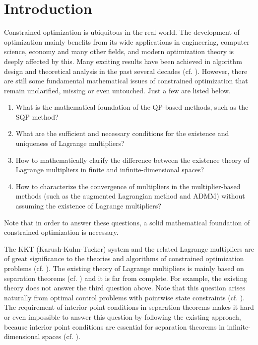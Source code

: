 \documentclass[leqno]{amsart}
\theoremstyle{definition}
\begin{document}
\section{Introduction}
Constrained optimization is ubiquitous in the real world. The development of optimization mainly benefits from its wide applications in engineering, computer science, economy and many other fields, and modern optimization theory is deeply affected by this. Many exciting results have been achieved in algorithm design and theoretical analysis in the past several decades (cf. \cite{bertsekas1996constrained, boyd2004convex, hinze2008optimization, ito2008lagrange, nocedal2006numerical}). However, there are still some fundamental mathematical issues of constrained optimization that remain unclarified, missing or even untouched. Just a few are listed below.
\begin{enumerate}[$\bullet$]
  \item What is the mathematical foundation of the QP-based methods, such as the SQP method?
  
  \item  What are the sufficient and necessary conditions for the existence and uniqueness of Lagrange multipliers? 
  
  \item  How to mathematically clarify the difference between the existence theory of Lagrange multipliers in finite and infinite-dimensional spaces?
  
  \item How to characterize the convergence of multipliers in the multiplier-based methods (such as the augmented Lagrangian method and ADMM) without assuming the existence of Lagrange multipliers?
      
\end{enumerate} 
Note that in order to answer these questions, a solid mathematical foundation of constrained optimization is necessary.

The KKT (Karush-Kuhn-Tucker) system and the related Lagrange multipliers are of great significance to the theories and algorithms of constrained optimization problems (cf. \cite{bertsekas1996constrained, bertsekas2009convex, hinze2008optimization, ito2008lagrange, karush1939minima, Kuhn2014, kuhn1951nonlinear, luenberger1997optimization, nocedal2006numerical, rockafellar1993lagrange, rockafellar1997convex}). The existing theory of Lagrange multipliers is mainly based on separation theorems (cf. \cite{hinze2008optimization, ito2008lagrange}) and it is far from  complete. For example, the existing theory does not answer the third question above. Note that this question arises naturally from optimal control problems with pointwise state constraints (cf. \cite{brenner2020p, hinze2008optimization, ito2008lagrange}). The requirement of interior point conditions in separation theorems makes it hard or even impossible to answer this question by following the existing approach, because interior point conditions are essential for separation theorems in infinite-dimensional spaces (cf. \cite[Chapter 1, Remark 4]{brezis2011functional}). 
\end{document}

